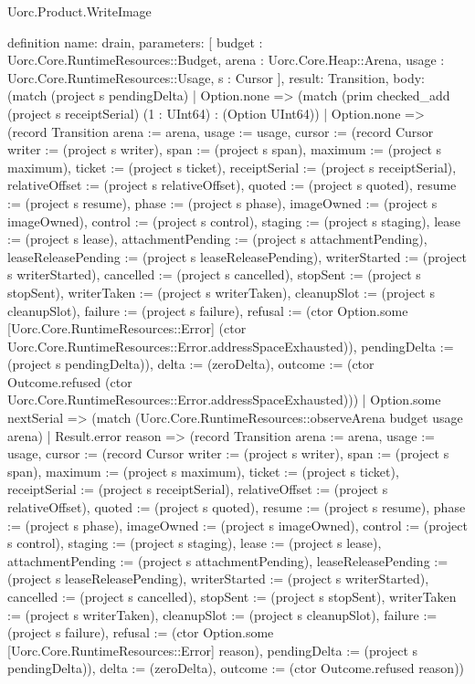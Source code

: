 \begin{lexlean}{Uorc.Product.WriteImage}
\begin{semanticmodule}
definition{
  name: drain,
  parameters: [
    budget : Uorc.Core.RuntimeResources::Budget,
    arena : Uorc.Core.Heap::Arena,
    usage : Uorc.Core.RuntimeResources::Usage,
    s : Cursor
  ],
  result: Transition,
  body: (match (project s pendingDelta)
    | Option.none => (match (prim checked_add (project s receiptSerial) (1 : UInt64) : (Option UInt64))
      | Option.none => (record Transition {arena := arena, usage := usage, cursor := (record Cursor {writer := (project s writer), span := (project s span), maximum := (project s maximum), ticket := (project s ticket), receiptSerial := (project s receiptSerial), relativeOffset := (project s relativeOffset), quoted := (project s quoted), resume := (project s resume), phase := (project s phase), imageOwned := (project s imageOwned), control := (project s control), staging := (project s staging), lease := (project s lease), attachmentPending := (project s attachmentPending), leaseReleasePending := (project s leaseReleasePending), writerStarted := (project s writerStarted), cancelled := (project s cancelled), stopSent := (project s stopSent), writerTaken := (project s writerTaken), cleanupSlot := (project s cleanupSlot), failure := (project s failure), refusal := (ctor Option.some [Uorc.Core.RuntimeResources::Error] (ctor Uorc.Core.RuntimeResources::Error.addressSpaceExhausted)), pendingDelta := (project s pendingDelta)}), delta := (zeroDelta), outcome := (ctor Outcome.refused (ctor Uorc.Core.RuntimeResources::Error.addressSpaceExhausted))})
      | Option.some nextSerial => (match (Uorc.Core.RuntimeResources::observeArena budget usage arena)
        | Result.error reason => (record Transition {arena := arena, usage := usage, cursor := (record Cursor {writer := (project s writer), span := (project s span), maximum := (project s maximum), ticket := (project s ticket), receiptSerial := (project s receiptSerial), relativeOffset := (project s relativeOffset), quoted := (project s quoted), resume := (project s resume), phase := (project s phase), imageOwned := (project s imageOwned), control := (project s control), staging := (project s staging), lease := (project s lease), attachmentPending := (project s attachmentPending), leaseReleasePending := (project s leaseReleasePending), writerStarted := (project s writerStarted), cancelled := (project s cancelled), stopSent := (project s stopSent), writerTaken := (project s writerTaken), cleanupSlot := (project s cleanupSlot), failure := (project s failure), refusal := (ctor Option.some [Uorc.Core.RuntimeResources::Error] reason), pendingDelta := (project s pendingDelta)}), delta := (zeroDelta), outcome := (ctor Outcome.refused reason)})
}
\end{semanticmodule}
\end{lexlean}
